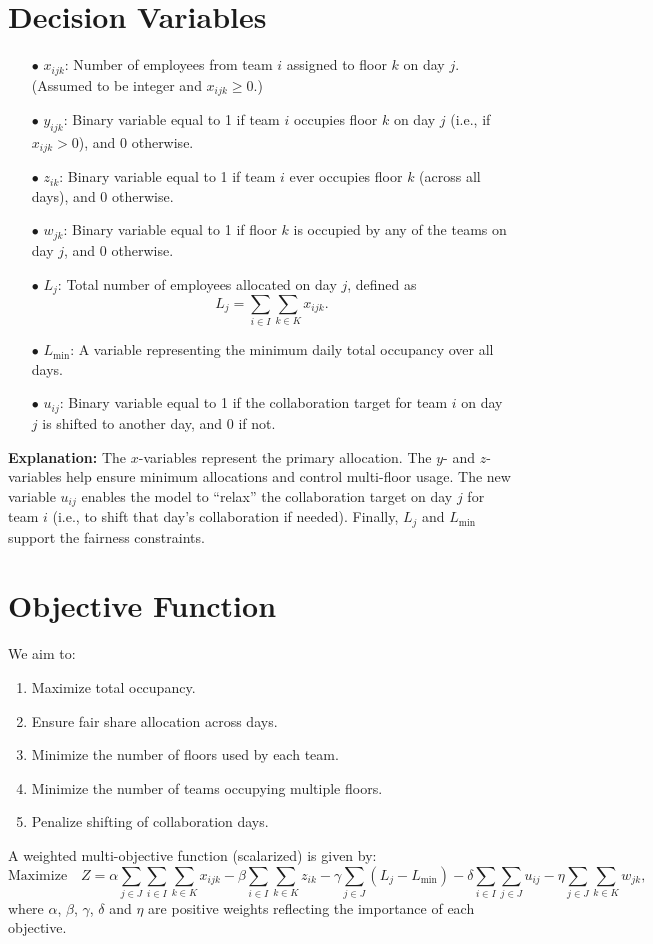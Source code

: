 \documentclass[11pt]{article}
\begin{document}
\section{Decision Variables}
\begin{itemize}[leftmargin=2em]
    \item[$\bullet$] $x_{ijk}$: Number of employees from team $i$ assigned to floor $k$ on day $j$. \\
    \quad (Assumed to be integer and $x_{ijk} \ge 0$.)
    \item[$\bullet$] $y_{ijk}$: Binary variable equal to 1 if team $i$ occupies floor $k$ on day $j$ (i.e., if $x_{ijk} > 0$), and 0 otherwise.
    \item[$\bullet$] $z_{ik}$: Binary variable equal to 1 if team $i$ ever occupies floor $k$ (across all days), and 0 otherwise.
    \item[$\bullet$] $w_{jk}$: Binary variable equal to 1 if floor $k$ is occupied by any of the teams on day $j$, and 0 otherwise.
    \item[$\bullet$] $L_j$: Total number of employees allocated on day $j$, defined as
    \[
    L_j = \sum_{i \in I} \sum_{k \in K} x_{ijk}.
    \]
    \item[$\bullet$] $L_{\min}$: A variable representing the minimum daily total occupancy over all days.
    \item[$\bullet$] $u_{ij}$: Binary variable equal to 1 if the collaboration target for team $i$ on day $j$ is shifted to another day, and 0 if not.
\end{itemize}
\textbf{Explanation:} The $x$-variables represent the primary allocation. The $y$- and $z$-variables help ensure minimum allocations and control multi-floor usage. The new variable $u_{ij}$ enables the model to “relax” the collaboration target on day $j$ for team $i$ (i.e., to shift that day’s collaboration if needed). Finally, $L_j$ and $L_{\min}$ support the fairness constraints.

\section{Objective Function}
We aim to:
\begin{enumerate}
    \item Maximize total occupancy.
    \item Ensure fair share allocation across days.
    \item Minimize the number of floors used by each team.
    \item Minimize the number of teams occupying multiple floors.
    \item Penalize shifting of collaboration days.
\end{enumerate}
A weighted multi-objective function (scalarized) is given by:
\[
\text{Maximize} \quad Z = \alpha \sum_{j \in J} \sum_{i \in I} \sum_{k \in K} x_{ijk} - \beta \sum_{i \in I} \sum_{k \in K} z_{ik} - \gamma \sum_{j \in J} (L_j - L_{\min}) - \delta \sum_{i \in I} \sum_{j \in J} u_{ij} - \eta \sum_{j \in J} \sum_{k \in K} w_{jk},
\]
where \(\alpha\), \(\beta\), \(\gamma\), \(\delta\) and \(\eta\) are positive weights reflecting the importance of each objective.
  
\end{document}
